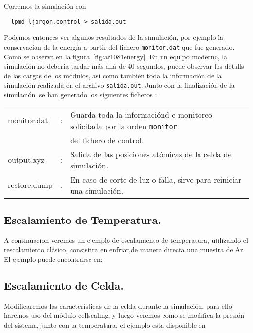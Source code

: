 Corremos la simulaci\'on con 
\begin{verbatim}
  lpmd ljargon.control > salida.out
\end{verbatim}


Podemos entonces ver algunos resultados de la simulaci\'on, por ejemplo la conservaci\'on de la energ\'ia a partir del fichero \verb|monitor.dat| que fue generado. Como se observa en la figura~\ref{fig:ar1081energy}. En un equipo moderno, la simulaci\'on no deber\'ia tardar m\'as all\'a de 40 segundos, puede observar los detalls de las cargas de los m\'odulos, asi como tambi\'en toda la informaci\'on de la simulaci\'on realizada en el archivo \verb|salida.out|. Junto con la finalizaci\'on de la simulaci\'on, se han generado los siguientes ficheros :

\begin{tabular}{lcl}\\
 monitor.dat &:& Guarda toda la informaci\'ond e monitoreo solicitada por la orden \verb|monitor|\\
&& del fichero de control. \\
 output.xyz &:& Salida de las posiciones at\'omicas de la celda de simulaci\'on. \\
 restore.dump &:& En caso de corte de luz o falla, sirve para reiniciar una simulaci\'on.\\
\end{tabular}

\subsection{Escalamiento de Temperatura.}

A continuacion veremos un ejemplo de escalamiento de temperatura, utilizando el rescalamiento cl\'asico, consistira en enfriar,de manera directa una muestra de Ar. El ejemplo puede encontrarse en:


\subsection{Escalamiento de Celda.}

Modificaremos las caracter\'isticas de la celda durante la simulaci\'on, para ello haremos uso del m\'odulo cellscaling, y luego veremos como se modifica la presi\'on del sistema, junto con la temperatura, el ejemplo esta disponible en

